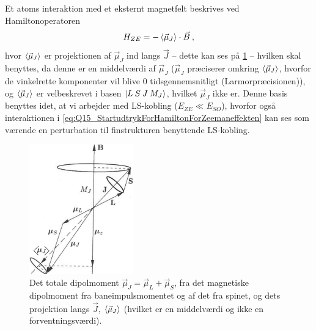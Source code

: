 Et atoms interaktion med et eksternt magnetfelt beskrives ved Hamiltonoperatoren
\begin{align} \label{eq:Q15_StartudtrykForHamiltonForZeemaneffekten}
    H_{ZE} = -\Braket{\Vec{\mu}_J} \cdot \Vec{B} \: ,
\end{align}
hvor $\Braket{\Vec{\mu}_J}$ er projektionen af $\Vec{\mu}_J$ ind langs $\Vec{J}$ -- dette kan ses på \cref{fig:Q15_ZeemanEffectInThePresenceOfSpin}
-- hvilken skal benyttes, da denne er en middelværdi af $\Vec{\mu}_J$ ($\Vec{\mu}_J$ præciserer omkring $\Braket{\Vec{\mu}_J}$, hvorfor de vinkelrette komponenter vil blive 0 tidsgennemsnitligt (Larmorpræcisionen)), og $\Braket{\Vec{\mu}_J}$ er velbeskrevet i basen $\ket{L \: S \: J \: M_J}$, hvilket $\Vec{\mu}_J$ ikke er. Denne basis benyttes idet, at vi arbejder med LS-kobling ($E_{ZE} \ll E_{SO}$), hvorfor også interaktionen i \cref{eq:Q15_StartudtrykForHamiltonForZeemaneffekten} kan ses som værende en perturbation til finstrukturen benyttende LS-kobling.

\begin{figure}[!h]
    \centering
    \includegraphics[width=0.4\textwidth]{Q15/images/ZeemanEffectWithLSCoupling.PNG}
    \caption{Det totale dipolmoment $\Vec{\mu}_J = \Vec{\mu}_L + \Vec{\mu}_S$, fra det magnetiske dipolmoment fra baneimpulsmomentet og af det fra spinet, og dets projektion langs $\Vec{J}$, $\Braket{\Vec{\mu}_J}$ (hvilket er en middelværdi og ikke en forventningsværdi).}
    \label{fig:Q15_ZeemanEffectInThePresenceOfSpin}
\end{figure}

